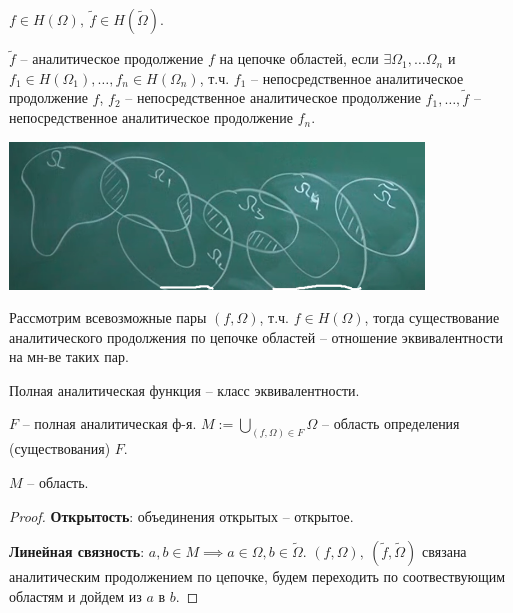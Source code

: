 \begin{definition}
    $f \in H(\Omega), \ \tilde{f} \in H(\tilde{\Omega})$.

    $\tilde{f}$ -- аналитическое продолжение $f$ на цепочке областей, если $\exists \Omega_1, \dots \Omega_n$ и $f_1 \in H(\Omega_1), \dots , f_n \in H(\Omega_n)$, т.ч. $f_1$ -- непосредственное аналитическое продолжение $f$, $f_2$ -- непосредственное аналитическое продолжение $f_1, \dots, \tilde{f}$ -- непосредственное аналитическое продолжение $f_n$.

    \begin{center}
        \includegraphics[width=11cm]{assets/04-functions-of-complex-variables/analitical-multiple-extension.png}
    \end{center}
\end{definition}



\begin{remark}
    Рассмотрим всевозможные пары $(f, \Omega)$, т.ч. $f \in H(\Omega)$, тогда существование аналитического продолжения по цепочке областей -- отношение эквивалентности на мн-ве таких пар. 
\end{remark}


\begin{definition}
    Полная аналитическая функция -- класс эквивалентности. 

    $F$ -- полная аналитическая ф-я. $M := \bigcup_{(f, \Omega) \in F} {\Omega}$ -- область определения (существования) $F$.
\end{definition}

\begin{statement}
    $M$ -- область.
\end{statement}
\begin{proof}
    \textbf{Открытость}: объединения открытых -- открытое.

    \textbf{Линейная связность}: $a, b \in M \implies a \in \Omega, b \in \tilde{\Omega}$. $(f, \Omega), \ (\tilde{f}, \tilde{\Omega})$ связана аналитическим продолжением по цепочке, будем переходить по соотвествующим областям и дойдем из $a$ в $b$.
\end{proof}


